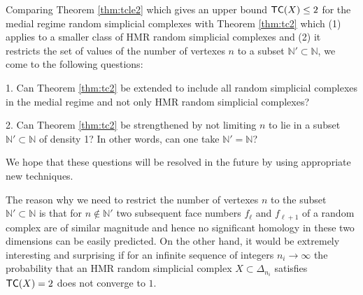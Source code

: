 \documentclass[10pt,a4paper]{amsart}
\newcommand{\N}{\mathbb{N}}
\newcommand{\tc}{{\sf{TC}}}
\begin{document}
Comparing Theorem \ref{thm:tcle2} which gives an upper bound $\tc(X)\le 2$ for the medial regime random simplicial complexes with 
Theorem \ref{thm:tc2} which (1) applies to a smaller class of HMR random simplicial complexes and (2) it restricts the set of values of the number of vertexes $n$ to a subset $\N'\subset \N$, we come to the following questions: 

1. Can Theorem \ref{thm:tc2} be extended to include all random simplicial complexes in the medial regime and not only HMR random simplicial complexes? 

2. Can Theorem \ref{thm:tc2} be strengthened by not limiting $n$ to lie in a subset $\N'\subset \N$ of density 1? In other words, can one take $\N'=\N$? 

We hope that these questions will be resolved in the future by using appropriate new techniques.  

The reason why we need to restrict the number of vertexes $n$ to the subset $\N'\subset \N$ is that for $n\notin \N'$ two subsequent face numbers $f_\ell$ and $f_{\ell+1}$ of a random complex are of similar magnitude and hence no significant homology in these two dimensions can be easily predicted. On the other hand, it would be extremely interesting and surprising
if for an infinite sequence of integers $n_i\to \infty$ the probability that an HMR random simplicial complex $X\subset \Delta_{n_i}$ satisfies 
$\tc(X)=2$ does not converge to $1$. 
\end{document}

